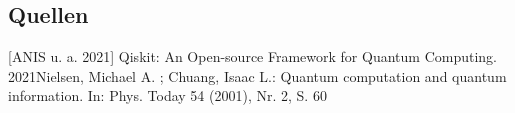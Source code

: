 \newline \newline
{}

\newline \newline
\subsection{Quellen}
[ANIS u. a. 2021] Qiskit: An Open-source Framework for Quantum Computing. 2021 Nielsen, Michael A. ; Chuang, Isaac L.: Quantum computation and quantum information. In: Phys. Today 54 (2001), Nr. 2, S. 60\newline

